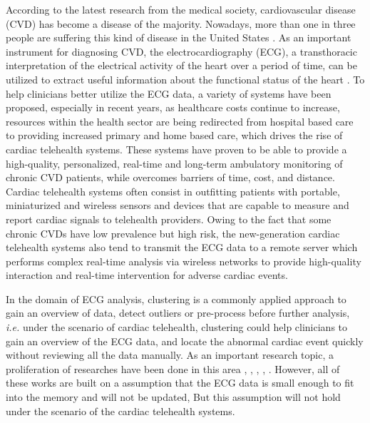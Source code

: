 \documentclass[conference]{IEEEtran}
\begin{document}
According to the latest research from the medical society, cardiovascular disease (CVD) has become a disease of the majority. Nowadays, more than one in three people are suffering this kind of disease in the United States \cite{Roger15122011}. As an important instrument for diagnosing CVD, the electrocardiography (ECG), a transthoracic interpretation of the electrical activity of the heart over a period of time, can be utilized to extract useful information about the functional status of the heart \cite{springerlink:10.1007/978-3-642-15020-3_21}. To help clinicians better utilize the ECG data, a variety of systems have been proposed, especially in recent years, as healthcare costs continue to increase, resources within the health sector are being redirected from hospital based care to providing increased primary and home based care, which drives the rise of cardiac telehealth systems\cite{demiris2010role}. These systems have proven to be able to provide a high-quality, personalized, real-time and long-term ambulatory monitoring of chronic CVD patients, while overcomes barriers of time, cost, and distance. Cardiac telehealth systems often consist in outfitting patients with portable, miniaturized and wireless sensors and devices that are capable to measure and report cardiac signals to telehealth providers. Owing to the fact that some chronic CVDs have low prevalence but high risk, the new-generation cardiac telehealth systems also tend to transmit the ECG data to a remote server which performs complex real-time analysis via wireless networks to provide high-quality interaction and real-time intervention for adverse cardiac events. 


In the domain of ECG analysis, clustering is a commonly applied approach to gain an overview of data, detect outliers or pre-process before further analysis, \textit{i.e.} under the scenario of cardiac telehealth, clustering could help clinicians to gain an overview of the ECG data, and locate the abnormal cardiac event quickly without reviewing all the data manually. As an important research topic, a proliferation of researches have been done in this area \cite{lagerholm2000clustering}, \cite{sufi2011clustering}, \cite{ceylan2009novel}, \cite{bortolan1991ecg}, \cite{bortolan1993diagnostic}. However, all of these works are built on a assumption that the ECG data is small enough to fit into the memory and will not be updated, But this assumption will not hold under the scenario of the cardiac telehealth systems.
\end{document}
